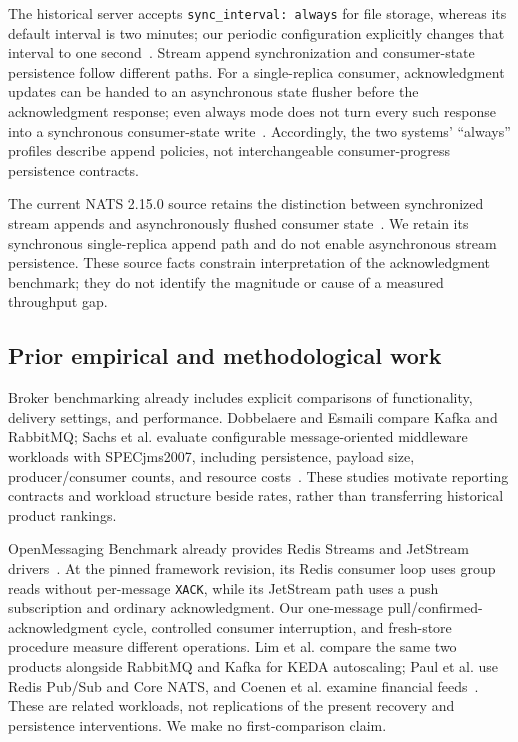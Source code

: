 \documentclass[11pt]{article}
\theoremstyle{definition}
\newcommand{\code}[1]{\texttt{#1}}
\begin{document}
The historical server accepts \code{sync\_interval: always} for file storage, whereas its default interval is two minutes; our periodic configuration explicitly changes that interval to one second~\cite{nats21024opts,nats21024filestore}. Stream append synchronization and consumer-state persistence follow different paths. For a single-replica consumer, acknowledgment updates can be handed to an asynchronous state flusher before the acknowledgment response; even always mode does not turn every such response into a synchronous consumer-state write~\cite{nats21024consumer,nats21024filestore}. Accordingly, the two systems' ``always'' profiles describe append policies, not interchangeable consumer-progress persistence contracts.

The current NATS 2.15.0 source retains the distinction between synchronized stream appends and asynchronously flushed consumer state~\cite{nats2150filestore,nats2150consumer}. We retain its synchronous single-replica append path and do not enable asynchronous stream persistence. These source facts constrain interpretation of the acknowledgment benchmark; they do not identify the magnitude or cause of a measured throughput gap.

\subsection{Prior empirical and methodological work}

Broker benchmarking already includes explicit comparisons of functionality, delivery settings, and performance. Dobbelaere and Esmaili compare Kafka and RabbitMQ; Sachs et al. evaluate configurable message-oriented middleware workloads with SPECjms2007, including persistence, payload size, producer/consumer counts, and resource costs~\cite{dobbelaere2017,sachs2009}. These studies motivate reporting contracts and workload structure beside rates, rather than transferring historical product rankings.

OpenMessaging Benchmark already provides Redis Streams and JetStream drivers~\cite{openmessaging2026}. At the pinned framework revision, its Redis consumer loop uses group reads without per-message \code{XACK}, while its JetStream path uses a push subscription and ordinary acknowledgment. Our one-message pull/confirmed-acknowledgment cycle, controlled consumer interruption, and fresh-store procedure measure different operations. Lim et al. compare the same two products alongside RabbitMQ and Kafka for KEDA autoscaling; Paul et al. use Redis Pub/Sub and Core NATS, and Coenen et al. examine financial feeds~\cite{lim2026,paul2026,coenen2019}. These are related workloads, not replications of the present recovery and persistence interventions. We make no first-comparison claim.
\end{document}
